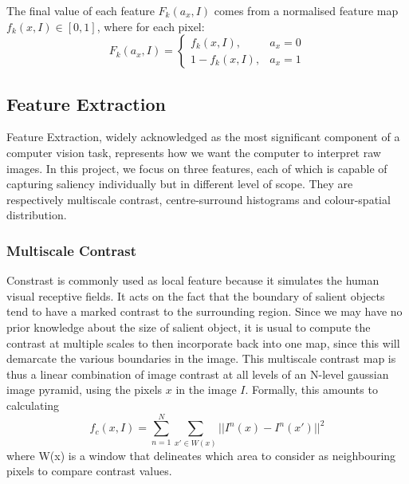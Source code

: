 \documentclass[10pt,twocolumn,letterpaper]{article}
\newcommand{\SUM}{\sum\limits}
\begin{document}
The final value of each feature $F_k(a_x,I)$ comes from a normalised feature map $f_k(x,I)\in[0,1]$, where for each pixel: $$F_k(a_x,I) = \left\{\begin{matrix}f_k(x,I), & a_x=0\\1-f_k(x,I), & a_x=1\end{matrix}\right.$$


\subsection{Feature Extraction}
Feature Extraction, widely acknowledged as the most significant component of a computer vision task, represents how we want the computer to interpret raw images. In this project, we focus on three features, each of which is capable of capturing saliency individually but in different level of scope. They are respectively multiscale contrast, centre-surround histograms  and colour-spatial distribution. 
\subsubsection{Multiscale Contrast}

Constrast is commonly used as local feature because it simulates the human visual receptive fields.
It acts on the fact that the boundary of salient objects tend to have a marked contrast to the
surrounding region. Since we may have no prior knowledge about the size of salient object,
it is usual to compute the contrast at multiple scales to then incorporate back into one map, since
this will demarcate the various boundaries in the image.  This multiscale contrast map is thus a
linear combination of image contrast at all levels of an N-level gaussian image pyramid, using the
pixels $x$ in the image $I$.  Formally, this amounts to calculating 
$$f_c(x,I) = \SUM_{n = 1}^{N}\SUM_{x'\in W(x)}||I^n(x)-I^n(x')||^2$$ where W(x) is a window that
delineates which area to consider as neighbouring pixels to compare contrast values.
\end{document}
